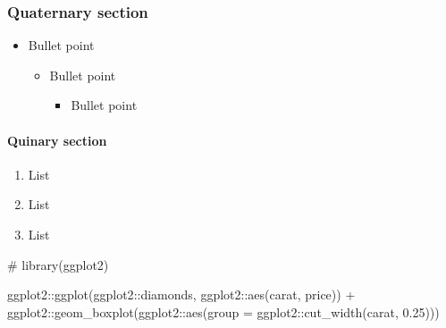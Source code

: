 \documentclass[
12pt,
openright,
oneside,
a4paper,
chapter=TITLE,
section=TITLE,
french,
spanish,
brazil,
english
]{abntex2}\usepackage{array}
\let\oldparagraph\paragraph
\renewcommand{\paragraph}[1]{\oldparagraph{#1}\mbox{}}
\newenvironment{Shaded}{\begin{snugshade}}{\end{snugshade}}
\newcommand{\AttributeTok}[1]{\textcolor[rgb]{0.40,0.45,0.13}{#1}}
\newcommand{\CommentTok}[1]{\textcolor[rgb]{0.37,0.37,0.37}{#1}}
\newcommand{\FloatTok}[1]{\textcolor[rgb]{0.68,0.00,0.00}{#1}}
\newcommand{\FunctionTok}[1]{\textcolor[rgb]{0.28,0.35,0.67}{#1}}
\newcommand{\NormalTok}[1]{\textcolor[rgb]{0.00,0.23,0.31}{#1}}
\newcommand{\SpecialCharTok}[1]{\textcolor[rgb]{0.37,0.37,0.37}{#1}}
\begin{document}
\clearpage

\hypertarget{quaternary-section}{%
\subsubsection{Quaternary section}\label{quaternary-section}}

\begin{itemize}
\tightlist
\item
  Bullet point

  \begin{itemize}
  \tightlist
  \item
    Bullet point

    \begin{itemize}
    \tightlist
    \item
      Bullet point
    \end{itemize}
  \end{itemize}
\end{itemize}

\hypertarget{quinary-section}{%
\paragraph{Quinary section}\label{quinary-section}}

\begin{enumerate}
\def\labelenumi{\arabic{enumi}.}
\tightlist
\item
  List
\item
  List
\item
  List
\end{enumerate}

\begin{Shaded}
\begin{Highlighting}[numbers=left,,]
\CommentTok{\# library(ggplot2)}

\NormalTok{ggplot2}\SpecialCharTok{::}\FunctionTok{ggplot}\NormalTok{(ggplot2}\SpecialCharTok{::}\NormalTok{diamonds, ggplot2}\SpecialCharTok{::}\FunctionTok{aes}\NormalTok{(carat, price)) }\SpecialCharTok{+}
\NormalTok{  ggplot2}\SpecialCharTok{::}\FunctionTok{geom\_boxplot}\NormalTok{(ggplot2}\SpecialCharTok{::}\FunctionTok{aes}\NormalTok{(}\AttributeTok{group =}\NormalTok{ ggplot2}\SpecialCharTok{::}\FunctionTok{cut\_width}\NormalTok{(carat, }\FloatTok{0.25}\NormalTok{)))}
\end{Highlighting}
\end{Shaded}
\end{document}
